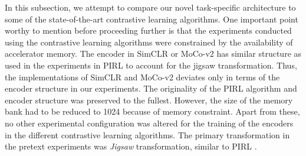 \documentclass[journal]{IEEEtai}
\begin{document}
In this subsection, we attempt to compare our novel task-specific architecture to some of the  state-of-the-art contrastive learning algorithms. One important point worthy to mention before proceeding further is that the experiments conducted using the contrastive learning algorithms were constrained by the availability of accelerator memory. The encoder in SimCLR \cite{simclr} or MoCo-v2 \cite{mocov2} has similar structure as used in the experiments in PIRL \cite{pirl} to account for the jigsaw transformation. Thus, the implementations of SimCLR \cite{simclr} and MoCo-v2 \cite{mocov2} deviates only in terms of the encoder structure in our experiments. The originality of the PIRL \cite{pirl} algorithm and encoder structure was preserved to the fullest. However, the size of the memory bank had to be reduced to 1024 because of memory constraint. Apart from these, no other experimental configuration was altered for the training of the encoders in the different contrastive learning algorithms. The primary transformation in the pretext experiments was \textit{Jigsaw} transformation, similar to PIRL \cite{pirl}.
\end{document}
